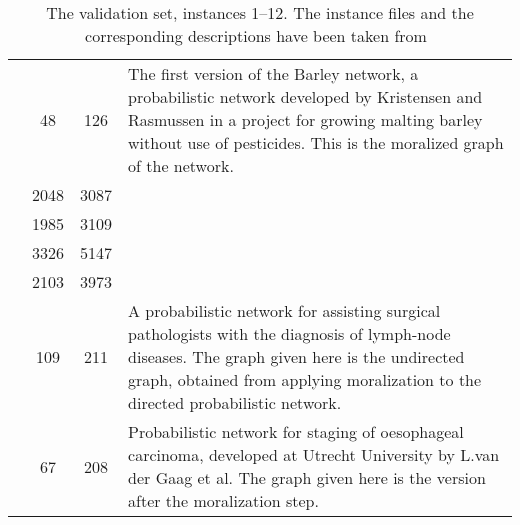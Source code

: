 \documentclass[thesis.tex]{subfiles}
\begin{document}
\newlength{\RowSeparatorLength}
\setlength{\RowSeparatorLength}{.4\baselineskip}
\begin{table}[tbp]
   \caption[Instances 1--12 of the validation set]{The validation set, instances 1--12. The instance files and the corresponding descriptions have been taken from~\parencite{treewidthlib}}
   \label{validationset1}
   \centering\footnotesize
   \begin{tabularx}{\textwidth}{p{5em}S[table-format=4]S[table-format=4]>{\raggedright\arraybackslash}X} \toprule
      &  &  & \\\midrule

       & 48 & 126 &
      The first version of the Barley network, a probabilistic network developed by Kristensen and Rasmussen in a project for growing malting barley without use of pesticides. This is the moralized graph of the network.\\[\RowSeparatorLength]

        & 2048 & 3087 &
      \\
       & 1985 & 3109 & \\
       & 3326 & 5147 & \\
        & 2103 & 3973 & \\[\RowSeparatorLength]

       & 109 & 211 &
      A probabilistic network for assisting surgical pathologists with the diagnosis of lymph-node diseases. The graph given here is the undirected graph, obtained from applying moralization to the directed probabilistic network.\\[\RowSeparatorLength]

       & 67 & 208 &
      Probabilistic network for staging of oesophageal carcinoma, developed at Utrecht University by L.\@ van der Gaag et al. The graph given here is the version after the moralization step.\\[\RowSeparatorLength]


\end{tabularx}
\end{table}
\end{document}
